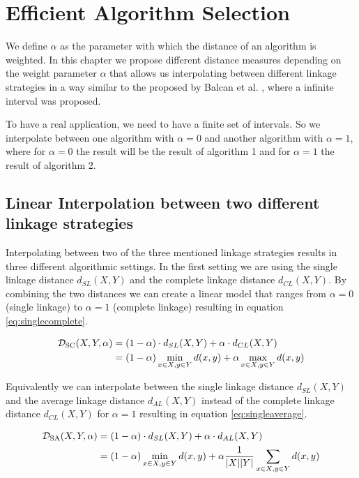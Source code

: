 \chapter{Efficient Algorithm Selection}
\label{chapter:alphalinkage}

We define $\alpha$ as the parameter with which the distance of an algorithm is weighted. In this chapter we propose different distance measures depending on the weight parameter $\alpha$ that allows us interpolating between different linkage strategies in a way similar to the proposed by Balcan et al. \cite{DBLP:journals/corr/BalcanNVW16}, where a infinite interval was proposed.

To have a real application, we need to have a finite set of intervals. So we interpolate between one algorithm with $\alpha = 0$ and another algorithm with $\alpha = 1$, where for $\alpha = 0$ the result will be the result of algorithm 1 and for $\alpha = 1$ the result of algorithm 2.

\section{Linear Interpolation between two different linkage strategies}

Interpolating between two of the three mentioned linkage strategies results in three different algorithmic settings. In the first setting we are using the single linkage distance $d_{SL}(X,Y)$ and the complete linkage distance $d_{CL}(X,Y)$. By combining the two distances we can create a linear model that ranges from $\alpha = 0$ (single linkage) to $\alpha = 1$ (complete linkage) resulting in equation \ref{eq:singlecomplete}.

\begin{equation}
    \begin{aligned}
        \mathcal{D}_\text{SC}(X,Y,\alpha) &= (1 - \alpha) \cdot d_{SL}(X,Y) + \alpha \cdot d_{CL}(X,Y)\\
        &= (1 - \alpha) \min\limits_{x \in X, y \in Y} d(x,y) + \alpha \max\limits_{x \in X, y \in Y} d(x,y)
    \end{aligned}
    \label{eq:singlecomplete}
\end{equation}

Equivalently we can interpolate between the single linkage distance $d_{SL}(X,Y)$ and the average linkage distance $d_{AL}(X,Y)$ instead of the complete linkage distance $d_{CL}(X,Y)$ for $\alpha = 1$ resulting in equation \ref{eq:singleaverage}. 

\begin{equation}
    \begin{aligned}
        \mathcal{D}_\text{SA}(X,Y,\alpha) &= (1 - \alpha) \cdot d_{SL}(X,Y) + \alpha \cdot d_{AL}(X,Y)\\
        &= (1 - \alpha) \min\limits_{x \in X, y \in Y} d(x,y) + \alpha \frac{1}{|X| |Y|}\sum\limits_{x \in X, y \in Y} d(x,y)
    \end{aligned}
    \label{eq:singleaverage}
\end{equation}

